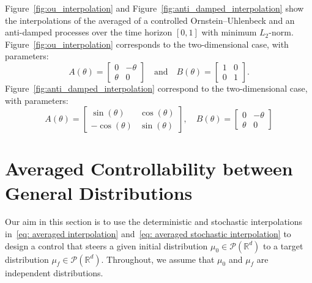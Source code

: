 \documentclass[12pt]{amsart}
\newcommand{\R}{\mathbb{R}}
\renewcommand{\(}{\left (}
\renewcommand{\)}{\right )}
\numberwithin{equation}{section}
\begin{document}
Figure~\ref{fig:ou_interpolation} and Figure~\ref{fig:anti_damped_interpolation} show the interpolations of the averaged of a controlled Ornstein–Uhlenbeck and an anti-damped processes over the time horizon $[0,1]$ with minimum $L_2$-norm.
Figure~\ref{fig:ou_interpolation} corresponds to the two-dimensional case, with parameters:
\begin{equation}\label{eq: 2D-Ornstein-Uhelbeck_parameters}
A(\theta)=\begin{bmatrix}
    0&-\theta\\
    \theta&0
\end{bmatrix}\quad\text{and}\quad B(\theta)=\begin{bmatrix}
    1&0\\
    0&1
\end{bmatrix}.    
\end{equation}
Figure~\ref{fig:anti_damped_interpolation} correspond to the two-dimensional case, with parameters:
\begin{equation}\label{eq: 2D_anti-damped_parameters}
A(\theta) = 
\begin{bmatrix}
\sin(\theta) & \cos(\theta) \\
-\cos(\theta)& \sin(\theta)
\end{bmatrix}, \quad 
B(\theta) = 
\begin{bmatrix}
    0&-\theta\\
    \theta& 0
\end{bmatrix}    
\end{equation}

\section{Averaged Controllability between General Distributions}\label{sec: Averaged Controllability between General Distributions}
Our aim in this section is to use the deterministic and stochastic interpolations in~\eqref{eq: averaged interpolation} and~\eqref{eq: averaged stochastic interpolation} to design a control that steers a given initial distribution $\mu_0\in \mathcal{P}(\R^d)$ to a target distribution $\mu_f\in\mathcal{P}(\R^d)$. Throughout, we assume that $\mu_0$ and $\mu_f$ are independent distributions. %
\end{document}
